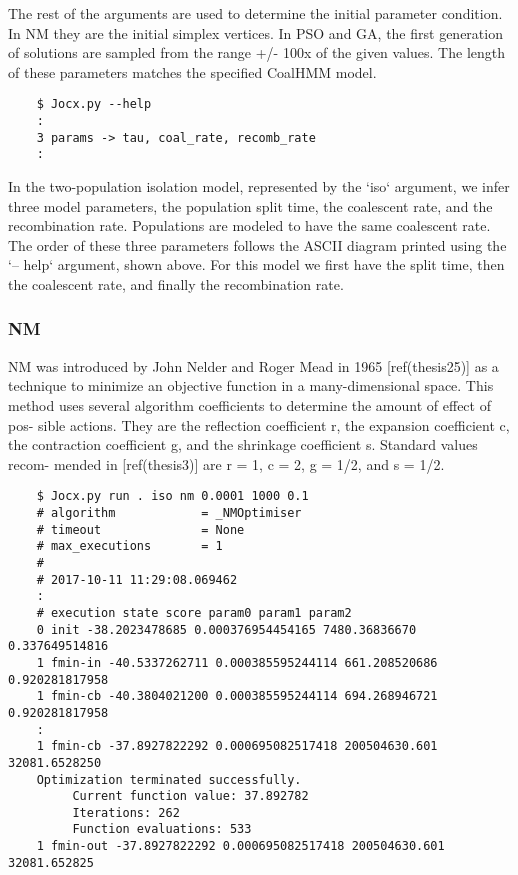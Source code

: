 The rest of the arguments are used to determine the initial parameter condition.
In NM they are the initial simplex vertices. In PSO and GA, the first generation
of solutions are sampled from the range +/- 100x of the given values. The length
of these parameters matches the specified CoalHMM model.

{\small{}\begin{verbatim}
    $ Jocx.py --help
    :
    3 params -> tau, coal_rate, recomb_rate
    :
\end{verbatim}}

In the two-population isolation model, represented by the ‘iso‘ argument, we
infer three model parameters, the population split time, the coalescent rate,
and the recombination rate. Populations are modeled to have the same coalescent
rate. The order of these three parameters follows the ASCII diagram printed
using the ‘– help‘ argument, shown above. For this model we first have the split
time, then the coalescent rate, and finally the recombination rate.

\subsubsection{NM}

NM was introduced by John Nelder and Roger Mead in 1965 [ref(thesis25)] as a
technique to minimize an objective function in a many-dimensional space. This
method uses several algorithm coefficients to determine the amount of effect of
pos- sible actions. They are the reflection coefficient r, the expansion
coefficient c, the contraction coefficient g, and the shrinkage coefficient s.
Standard values recom- mended in [ref(thesis3)] are r = 1, c = 2, g = 1/2, and s =
1/2.

{\small{}\begin{verbatim}
    $ Jocx.py run . iso nm 0.0001 1000 0.1
    # algorithm            = _NMOptimiser
    # timeout              = None
    # max_executions       = 1
    #
    # 2017-10-11 11:29:08.069462
    :
    # execution state score param0 param1 param2
    0 init -38.2023478685 0.000376954454165 7480.36836670 0.337649514816
    1 fmin-in -40.5337262711 0.000385595244114 661.208520686 0.920281817958
    1 fmin-cb -40.3804021200 0.000385595244114 694.268946721 0.920281817958
    :
    1 fmin-cb -37.8927822292 0.000695082517418 200504630.601 32081.6528250
    Optimization terminated successfully.
         Current function value: 37.892782
         Iterations: 262
         Function evaluations: 533
    1 fmin-out -37.8927822292 0.000695082517418 200504630.601 32081.652825
\end{verbatim}}

